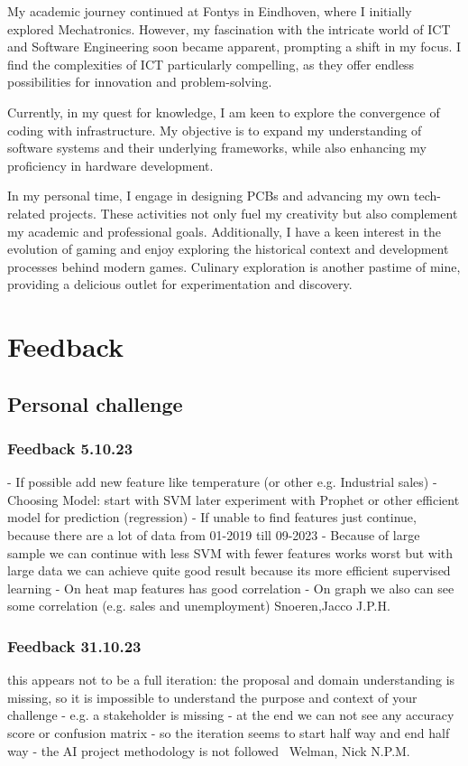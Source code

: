 \documentclass[a4paper, 11pt]{article}
\begin{document}
My academic journey continued at Fontys in Eindhoven, where I initially explored Mechatronics. However, my fascination with the intricate world of ICT and Software Engineering soon became apparent, prompting a shift in my focus. I find the complexities of ICT particularly compelling, as they offer endless possibilities for innovation and problem-solving.
\medbreak

Currently, in my quest for knowledge, I am keen to explore the convergence of coding with infrastructure. My objective is to expand my understanding of software systems and their underlying frameworks, while also enhancing my proficiency in hardware development.
\medbreak

In my personal time, I engage in designing PCBs and advancing my own tech-related projects. These activities not only fuel my creativity but also complement my academic and professional goals. Additionally, I have a keen interest in the evolution of gaming and enjoy exploring the historical context and development processes behind modern games. Culinary exploration is another pastime of mine, providing a delicious outlet for experimentation and discovery.

\section{Feedback}

\subsection{Personal challenge}

\subsubsection{Feedback 5.10.23}
- If possible add new feature like temperature (or other e.g. Industrial sales)
- Choosing Model: start with SVM later experiment with Prophet or other efficient model for prediction (regression)
- If unable to find features just continue, because there are a lot of data from 01-2019 till 09-2023
- Because of large sample we can continue with less SVM with fewer features works worst but with large data we can achieve quite good result because its more efficient supervised learning
- On heat map features has good correlation
- On graph we also can see some correlation (e.g. sales and unemployment)
\smallbreak
 Snoeren,Jacco J.P.H.

\subsubsection{Feedback 31.10.23}
this appears not to be a full iteration: the proposal and domain understanding is missing, so it is impossible to understand the purpose and context of your challenge - e.g. a stakeholder is missing - at the end we can not see any accuracy score or confusion matrix - so the iteration seems to start half way and end half way - the AI project methodology is not followed
\smallbreak
~Welman, Nick N.P.M.
\end{document}
